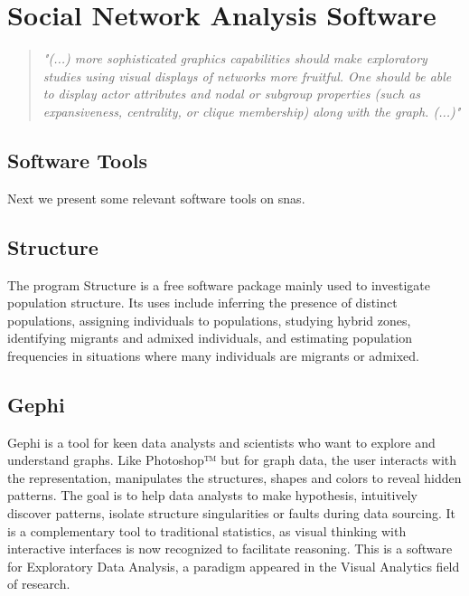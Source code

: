 \section{Social Network Analysis Software}
\label{sec:snas}

\begin{quote}
\textit{"(...) more sophisticated graphics capabilities should make exploratory studies using visual displays of networks more fruitful. One should be able to display actor attributes and nodal or subgroup properties (such as expansiveness, centrality, or clique membership) along with the graph. (...)"} \cite{wasserman1994social}
\end{quote}

\subsection{Software Tools}
Next we present some relevant software tools on \glspl{sna}.

\subsection{Structure}

\indent \indent The program Structure \cite{structure-software} is a free software package mainly used to investigate population structure. Its uses include inferring the presence of distinct populations, assigning individuals to populations, studying hybrid zones, identifying migrants and admixed individuals, and estimating population frequencies in situations where many individuals are migrants or admixed.

\subsection{Gephi}

\indent \indent Gephi \cite{bastian2009gephi} is a tool for keen data analysts and scientists who want to explore and understand graphs. Like Photoshop™ but for graph data, the user interacts with the representation, manipulates the structures, shapes and colors to reveal hidden patterns. The goal is to help data analysts to make hypothesis, intuitively discover patterns, isolate structure singularities or faults during data sourcing. It is a complementary tool to traditional statistics, as visual thinking with interactive interfaces is now recognized to facilitate reasoning. This is a software for Exploratory Data Analysis, a paradigm appeared in the Visual Analytics field of research.

